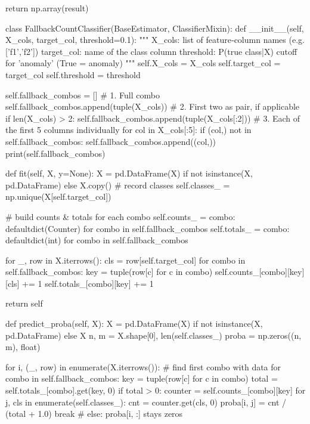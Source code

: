 {{        return np.array(result)

class FallbackCountClassifier(BaseEstimator, ClassifierMixin):
    def __init__(self, X_cols, target_col, threshold=0.1):
        """
        X_cols: list of feature‐column names (e.g. ['f1','f2'])
        target_col: name of the class column
        threshold: P(true class|X) cutoff for 'anomaly' (True = anomaly)
        """
        self.X_cols = X_cols
        self.target_col = target_col
        self.threshold = threshold
        
        self.fallback_combos = []
        # 1. Full combo
        self.fallback_combos.append(tuple(X_cols))
        # 2. First two as pair, if applicable
        if len(X_cols) > 2:
            self.fallback_combos.append(tuple(X_cols[:2]))
        # 3. Each of the first 5 columns individually
        for col in X_cols[:5]:
            if (col,) not in self.fallback_combos:
                self.fallback_combos.append((col,))
        print(self.fallback_combos)

    def fit(self, X, y=None):
        X = pd.DataFrame(X) if not isinstance(X, pd.DataFrame) else X.copy()
        # record classes
        self.classes_ = np.unique(X[self.target_col])

        # build counts & totals for each combo
        self.counts_ = {combo: defaultdict(Counter) 
                        for combo in self.fallback_combos}
        self.totals_ = {combo: defaultdict(int) 
                        for combo in self.fallback_combos}

        for _, row in X.iterrows():
            cls = row[self.target_col]
            for combo in self.fallback_combos:
                key = tuple(row[c] for c in combo)
                self.counts_[combo][key][cls] += 1
                self.totals_[combo][key] += 1

        return self

    def predict_proba(self, X):
        X = pd.DataFrame(X) if not isinstance(X, pd.DataFrame) else X
        n, m = X.shape[0], len(self.classes_)
        proba = np.zeros((n, m), float)

        for i, (_, row) in enumerate(X.iterrows()):
            # find first combo with data
            for combo in self.fallback_combos:
                key = tuple(row[c] for c in combo)
                total = self.totals_[combo].get(key, 0)
                if total > 0:
                    counter = self.counts_[combo][key]
                    for j, cls in enumerate(self.classes_):
                        cnt = counter.get(cls, 0)
                        proba[i, j] = cnt / (total + 1.0)
                    break
            # else: proba[i, :] stays zeros

}}
